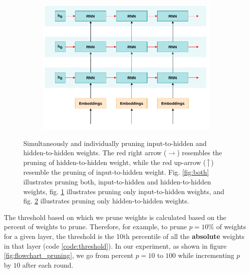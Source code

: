 \begin{figure}[h]
\begin{subfigure}{0.33\textwidth}
    \caption{} \label{fig:i2h}
  \end{subfigure}%
  \begin{subfigure}{0.33\textwidth}
    \includegraphics[width=\linewidth]{images/experiments/h2h_prune.png}
    \caption{} \label{fig:h2h}
  \end{subfigure}

\caption[Simultaneous and individual pruning of i2h and h2h weights]{Simultaneously and individually pruning input-to-hidden and hidden-to-hidden weights. The red right arrow (\textcolor{red}{$\longrightarrow$}) resembles the pruning of hidden-to-hidden weight, while the red up-arrow (\textcolor{red}{$\big\uparrow$}) resemble the pruning of input-to-hidden weight. Fig. \ref{fig:both} illustrates pruning both, input-to-hidden and hidden-to-hidden weights, fig. \ref{fig:i2h} illustrates pruning only input-to-hidden weights, and fig. \ref{fig:h2h} illustrates pruning only hidden-to-hidden weights.} \label{fig:pruning}
\end{figure}

The threshold based on which we prune weights is calculated based on the percent of weights to prune. Therefore, for example, to prune $p=10\%$ of weights for a given layer, the threshold is the 10th percentile of all the \textbf{absolute} weights in that layer (code \ref{code:threshold}). In our experiment, as shown in figure \ref{fig:flowchart_pruning}, we go from percent $p=10$ to $100$ while incrementing $p$ by $10$ after each round.

